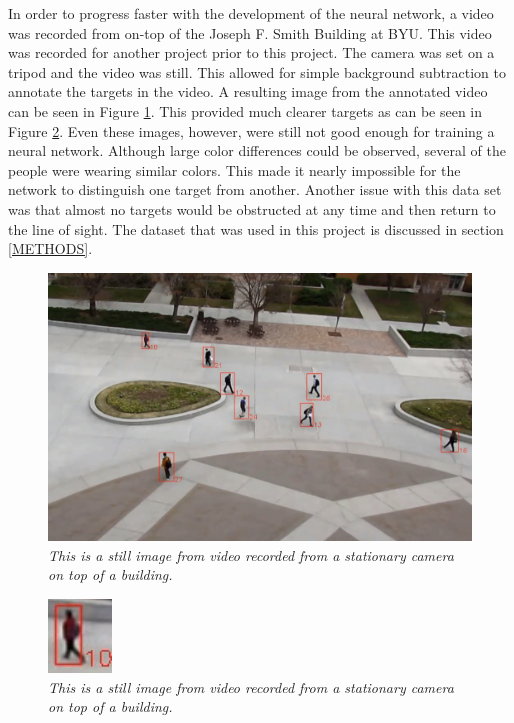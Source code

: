 \documentclass[letterpaper, 10 pt, conference]{ieeeconf}  %
\begin{document}
In order to progress faster with the development of the neural network, a video was recorded from on-top of the Joseph F. Smith Building at BYU. This video was recorded for another project prior to this project. The camera was set on a tripod and the video was still. This allowed for simple background subtraction to annotate the targets in the video. A resulting image from the annotated video can be seen in Figure \ref{fig:jfsb}. This provided much clearer targets as can be seen in Figure \ref{fig:jfsb_zoomed}. Even these images, however, were still not good enough for training a neural network. Although large color differences could be observed, several of the people were wearing similar colors. This made it nearly impossible for the network to distinguish one target from another. Another issue with this data set was that almost no targets would be obstructed at any time and then return to the line of sight. The dataset that was used in this project is discussed in section \ref{METHODS}. 

\begin{figure}
	\begin{center}
		\includegraphics[width=.45\textwidth]{jfsb.png}
		\caption{\textit{This is a still image from video recorded from a stationary camera on top of a building.}} 
		\label{fig:jfsb}
	\end{center}
\end{figure}

\begin{figure}
	\begin{center}
		\includegraphics[width=.45\textwidth]{jfsb_zoomed.png}
		\caption{\textit{This is a still image from video recorded from a stationary camera on top of a building.}} 
		\label{fig:jfsb_zoomed}
	\end{center}
\end{figure}
\end{document}
